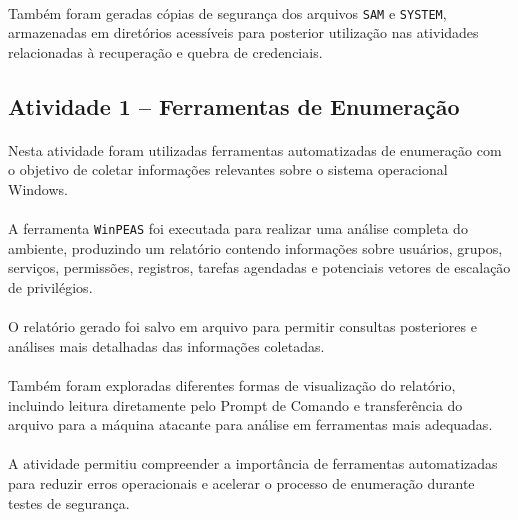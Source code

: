 \paragraph{}
Também foram geradas cópias de segurança dos arquivos \texttt{SAM} e
\texttt{SYSTEM}, armazenadas em diretórios acessíveis para posterior utilização
nas atividades relacionadas à recuperação e quebra de credenciais.

\subsection{Atividade 1 -- Ferramentas de Enumeração}

\paragraph{}
Nesta atividade foram utilizadas ferramentas automatizadas de enumeração com o
objetivo de coletar informações relevantes sobre o sistema operacional Windows.

\paragraph{}
A ferramenta \texttt{WinPEAS} foi executada para realizar uma análise completa
do ambiente, produzindo um relatório contendo informações sobre usuários,
grupos, serviços, permissões, registros, tarefas agendadas e potenciais vetores
de escalação de privilégios.

\paragraph{}
O relatório gerado foi salvo em arquivo para permitir consultas posteriores e
análises mais detalhadas das informações coletadas.

\paragraph{}
Também foram exploradas diferentes formas de visualização do relatório,
incluindo leitura diretamente pelo Prompt de Comando e transferência do arquivo
para a máquina atacante para análise em ferramentas mais adequadas.

\paragraph{}
A atividade permitiu compreender a importância de ferramentas automatizadas para
reduzir erros operacionais e acelerar o processo de enumeração durante testes de
segurança.

